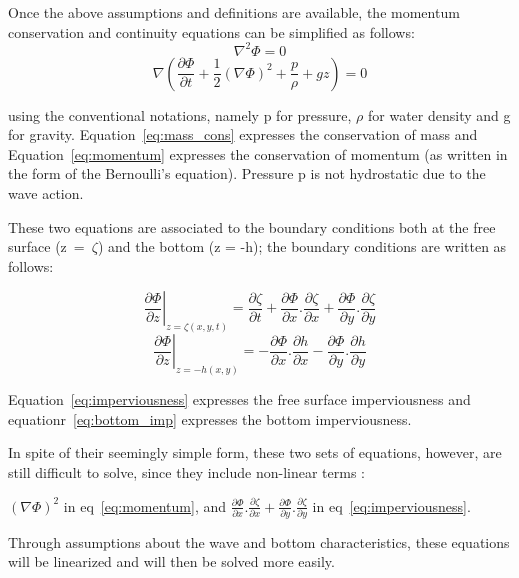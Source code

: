 Once the above assumptions and definitions are available, the momentum
conservation and continuity equations can be simplified as follows:
\begin{equation}
  \nabla^{2}\Phi = 0
  \label{eq:mass_cons}
\end{equation}
\begin{equation}
  \nabla \left(\frac{\partial\Phi}{\partial t}+\frac{1}{2}(\nabla\Phi)^{2}+\frac{p}{\rho}+gz\right)=0
  \label{eq:momentum}
\end{equation}

using the conventional notations, namely p for pressure, $\rho$ for water
density and g for gravity. Equation~\ref{eq:mass_cons} expresses the
conservation of mass and Equation~\ref{eq:momentum} expresses the conservation
of momentum (as written in the form of the Bernoulli's equation). Pressure p is
not hydrostatic due to the wave action.

These two equations are associated to the boundary conditions both at the free
surface (z~=~$\zeta$) and the bottom (z = -h); the boundary conditions are
written as follows:

\begin{equation}
  \left.\frac{\partial\Phi}{\partial z}\right|_{z=\zeta(x,y,t)} =
       \frac{\partial\zeta}{\partial t} +
       \frac{\partial\Phi}{\partial x}.\frac{\partial\zeta}{\partial x} +
       \frac{\partial\Phi}{\partial y}.\frac{\partial\zeta}{\partial y}
  \label{eq:imperviousness}
\end{equation}
\begin{equation}
  \left.\frac{\partial\Phi}{\partial z}\right|_{z=-h(x,y)} =
       -\frac{\partial\Phi}{\partial x}.\frac{\partial h}{\partial x}
       -\frac{\partial\Phi}{\partial y}.\frac{\partial h}{\partial y}
  \label{eq:bottom_imp}
\end{equation}

Equation~\ref{eq:imperviousness} expresses the free surface imperviousness and
equationr~\ref{eq:bottom_imp} expresses the bottom imperviousness.

In spite of their seemingly simple form, these two sets of equations, however,
are still difficult to solve, since they include non-linear terms :


$(\nabla\Phi)^{2}$ in eq~\ref{eq:momentum}, and
$\frac{\partial\Phi}{\partial x}.\frac{\partial\zeta}{\partial x} +
 \frac{\partial\Phi}{\partial y}.\frac{\partial\zeta}{\partial y}$
 in eq~\eqref{eq:imperviousness}.

Through assumptions about the wave and bottom characteristics, these equations
will be linearized and will then be solved more easily.


